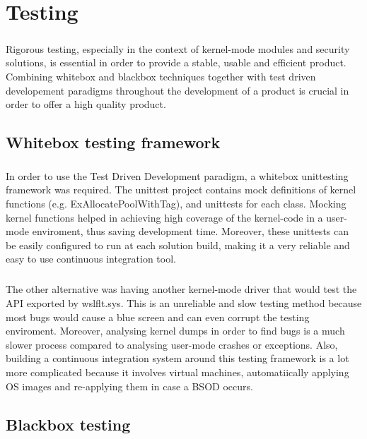 \chapter{Testing}
    \paragraph{}
    Rigorous testing, especially in the context of kernel-mode modules and security solutions, is essential in order to provide a stable,
    usable and efficient product. Combining whitebox and blackbox techniques together with test driven developement paradigms throughout
    the development of a product is crucial in order to offer a high quality product.
    \section{Whitebox testing framework}
        \paragraph{}
        In order to use the Test Driven Development paradigm, a whitebox unittesting framework was required. The unittest project contains
        mock definitions of kernel functions (e.g. ExAllocatePoolWithTag), and unittests for each class. Mocking kernel functions helped in
        achieving high coverage of the kernel-code in a user-mode enviroment, thus saving development time. Moreover, these unittests can be
        easily configured to run at each solution build, making it a very reliable and easy to use continuous integration tool.
        \paragraph{}
        The other alternative was having another kernel-mode driver that would test the API exported by wslflt.sys. This is an unreliable
        and slow testing method because most bugs would cause a blue screen and can even corrupt the testing enviroment. Moreover, analysing
        kernel dumps in order to find bugs is a much slower process compared to analysing user-mode crashes or exceptions. Also, building a
        continuous integration system around this testing framework is a lot more complicated because it involves virtual machines,
        automatiically applying OS images and re-applying them in case a BSOD occurs.
    \section{Blackbox testing}
